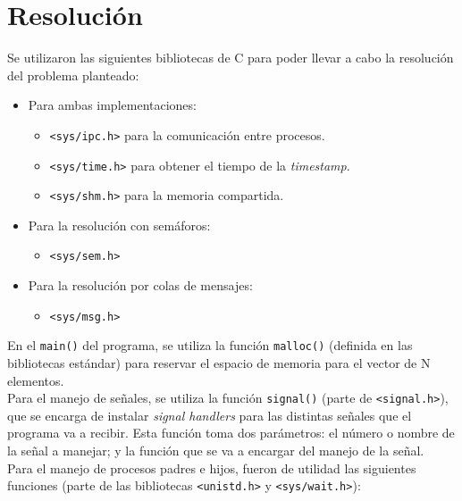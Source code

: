 \section{Resolución}

Se utilizaron las siguientes bibliotecas de C para poder llevar a cabo la resolución del problema planteado:
\begin{itemize}
    \item Para ambas implementaciones:
    \begin{itemize}
        \item \texttt{<sys/ipc.h>} para la comunicación entre procesos.
        \item \texttt{<sys/time.h>} para obtener el tiempo de la \textit{timestamp}.
        \item \texttt{<sys/shm.h>} para la memoria compartida.
    \end{itemize}
    \item Para la resolución con semáforos:
    \begin{itemize}
        \item \texttt{<sys/sem.h>}
    \end{itemize}
    \item Para la resolución por colas de mensajes:
    \begin{itemize}
        \item \texttt{<sys/msg.h>}
    \end{itemize}
\end{itemize}

En el \texttt{main()} del programa, se utiliza la función \texttt{malloc()} (definida en las bibliotecas estándar) para reservar el espacio de memoria para el vector de N elementos.\\

Para el manejo de señales, se utiliza la función \texttt{signal()} (parte de \texttt{<signal.h>}), que se encarga de instalar \textit{signal handlers} para las distintas señales que el programa va a recibir. Esta función toma dos parámetros: el número o nombre de la señal a manejar; y la función que se va a encargar del manejo de la señal.\\ 

Para el manejo de procesos padres e hijos, fueron de utilidad las siguientes funciones (parte de las bibliotecas \texttt{<unistd.h>} y \texttt{<sys/wait.h>}):

